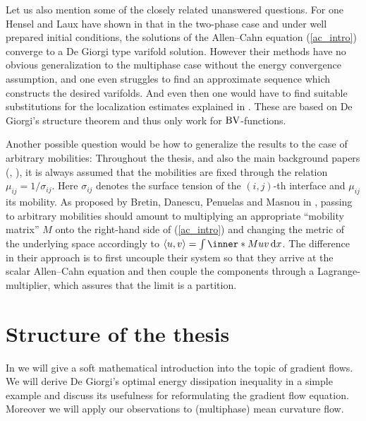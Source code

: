 Let us also mention some of the closely related unanswered questions. For one 
Hensel and Laux have shown in 
\cite{hensel_laux_varifold_solution_concept_for_mean_curvature_flow}
that in the two-phase case and under well prepared initial conditions, the
solutions of the Allen--Cahn equation (\ref{ac_intro}) converge to a De Giorgi 
type varifold solution. However their methods have no obvious generalization to 
the multiphase case without the energy convergence assumption, and one even 
struggles to find an approximate sequence 
which constructs the desired varifolds. And even then one would have to find 
suitable substitutions for the localization estimates explained in 
. 
These are based on De Giorgi's structure 
theorem and thus only work for $ \operatorname{BV} $-functions.

Another possible question would be how to generalize the results to the case 
of 
arbitrary mobilities: Throughout the thesis, and also the main background 
papers 
(\cite{convergence_of_allen_cahn_equation_to_multiphase_mean_curvature_flow},
\cite{hensel_laux_varifold_solution_concept_for_mean_curvature_flow}), it is 
always assumed that the mobilities are fixed through the relation $ \mu_{ i j } 
= 1/ \sigma_{ i j } $.
Here $ \sigma_{ i j } $ denotes the surface tension of 
the $ ( i , j ) $-th interface and $ \mu_{ i j } $ its mobility. As proposed by
Bretin, Danescu, Penuelas and Masnou in 
\cite{bretin_dansecu_penuelas_masnou_a_metric_based_approach_to_mmcf_with_mobilities},
passing
to arbitrary mobilities should 
amount to multiplying an appropriate \enquote{mobility matrix} $ M $ onto the 
right-hand side of (\ref{ac_intro}) and changing the metric of the underlying 
space accordingly to $ \langle u , v \rangle = \int \inner*{M u}{ v} \dd{ x } $.
The difference in their approach is to first uncouple their system so that 
they arrive at the scalar Allen--Cahn equation and then couple the components 
through a Lagrange-multiplier, which assures that the limit is a partition.

\section{Structure of the thesis}

In  we will give a soft mathematical 
introduction into the topic of gradient flows. We will derive De Giorgi's 
optimal energy dissipation inequality in a simple example and discuss its 
usefulness for 
reformulating the gradient flow equation. Moreover we will apply our 
observations 
to (multiphase) mean curvature flow.

